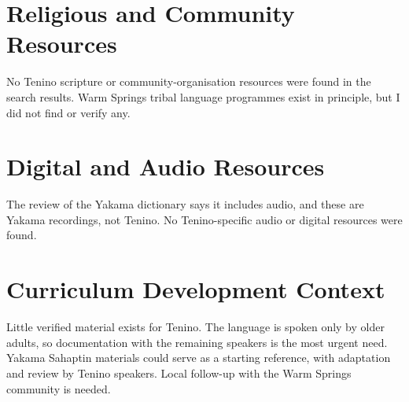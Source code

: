 \documentclass[12pt]{article}
\begin{document}
\section{Religious and Community Resources}
No Tenino scripture or community-organisation resources were found in the search results. Warm Springs tribal language programmes exist in principle, but I did not find or verify any.

\section{Digital and Audio Resources}
The review of the Yakama dictionary says it includes audio, and these are Yakama recordings, not Tenino. No Tenino-specific audio or digital resources were found.

\section{Curriculum Development Context}
Little verified material exists for Tenino. The language is spoken only by older adults, so documentation with the remaining speakers is the most urgent need. Yakama Sahaptin materials could serve as a starting reference, with adaptation and review by Tenino speakers. Local follow-up with the Warm Springs community is needed.
\end{document}
